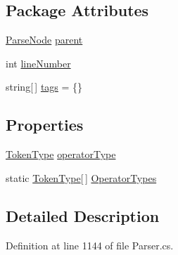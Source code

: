 \subsection*{Package Attributes}
\begin{DoxyCompactItemize}
\item 
\hyperlink{a00138}{Parse\-Node} \hyperlink{a00138_af313a82103fcc2ff5a177dbb06b92f7b}{parent}
\item 
int \hyperlink{a00138_a18b493382de0fde5b4299c1bd2250075}{line\-Number}
\item 
string\mbox{[}$\,$\mbox{]} \hyperlink{a00138_a58b3a15788fd2d4127d73619dc6d04ae}{tags} = \{\}
\end{DoxyCompactItemize}
\subsection*{Properties}
\begin{DoxyCompactItemize}
\item 
\hyperlink{a00041_a301aa7c866593a5b625a8fc158bbeace}{Token\-Type} \hyperlink{a00133_ac2de2f59be0e69b316627a4de16fadd3}{operator\-Type}
\item 
static \hyperlink{a00041_a301aa7c866593a5b625a8fc158bbeace}{Token\-Type}\mbox{[}$\,$\mbox{]} \hyperlink{a00133_ad8a4bb1b46dbc3d1b7708e78a2d97e1c}{Operator\-Types}
\end{DoxyCompactItemize}


\subsection{Detailed Description}


Definition at line 1144 of file Parser.\-cs.



